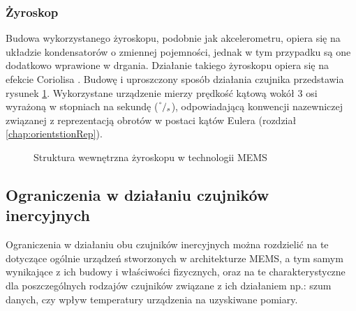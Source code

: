 \subsubsection*{Żyroskop}
Budowa wykorzystanego żyroskopu, podobnie jak akcelerometru, opiera się na układzie kondensatorów o zmiennej pojemności, jednak w tym przypadku są one dodatkowo wprawione w drgania. Działanie takiego żyroskopu opiera się na efekcie Coriolisa \cite{memsAccIdea2016}. Budowę i uproszczony sposób działania czujnika przedstawia rysunek \ref{fig:characteristics:imu:gyro:mems}. Wykorzystane urządzenie mierzy prędkość kątową wokół 3 osi wyrażoną w stopniach na sekundę ($^\degree/_s$), odpowiadającą konwencji nazewniczej związanej z reprezentacją obrotów w postaci kątów Eulera (rozdział \ref{chap:orientstionRep}). 
		
\begin{figure}[!htp]
								
	\caption{Struktura wewnętrzna żyroskopu w technologii MEMS}
	\label{fig:characteristics:imu:gyro:mems}
\end{figure}
		
\subsection{Ograniczenia w działaniu czujników inercyjnych}
Ograniczenia w działaniu obu czujników inercyjnych można rozdzielić na te dotyczące ogólnie urządzeń stworzonych w architekturze MEMS, a tym samym wynikające z ich budowy i właściwości fizycznych, oraz na te charakterystyczne dla poszczególnych rodzajów czujników związane z ich działaniem np.: szum danych, czy wpływ temperatury urządzenia na uzyskiwane pomiary.
		

